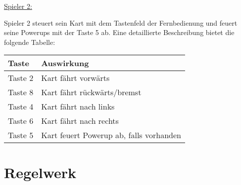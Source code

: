 \underline{Spieler 2:}
 
Spieler 2 steuert sein Kart mit dem Tastenfeld der Fernbedienung und feuert seine Powerups mit der Taste 5 ab. Eine detaillierte Beschreibung bietet die folgende Tabelle:

\vspace{0.5cm}
\begin{tabular}{|l|l|}
\hline
Taste & Auswirkung \\ \hline
Taste 2 & Kart fährt vorwärts \\ \hline
Taste 8 & Kart fährt rückwärts/bremst \\ \hline
Taste 4 & Kart fährt nach links \\ \hline
Taste 6 & Kart fährt nach rechts \\ \hline
Taste 5 & Kart feuert Powerup ab, falls vorhanden \\ \hline 
\end{tabular}
\vspace{0.5cm}

\section{Regelwerk}

 



































